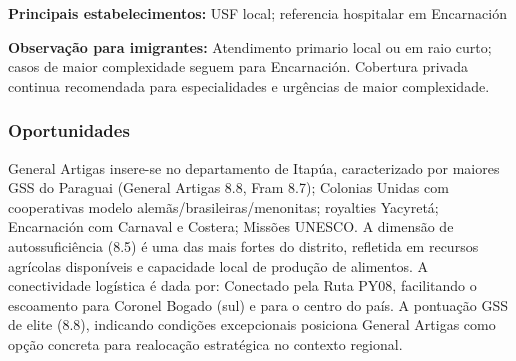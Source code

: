 \textbf{Principais estabelecimentos:} USF local; referencia hospitalar
em Encarnación

\textbf{Observação para imigrantes:} Atendimento primario local ou em
raio curto; casos de maior complexidade seguem para Encarnación.
Cobertura privada continua recomendada para especialidades e urgências
de maior complexidade.
\newpage

\subsubsection*{Oportunidades}\label{oport-general-artigas-0712}
General Artigas insere-se no departamento de Itapúa, caracterizado por maiores GSS do Paraguai (General Artigas 8.8, Fram 8.7); Colonias Unidas com cooperativas modelo alemãs/brasileiras/menonitas; royalties Yacyretá; Encarnación com Carnaval e Costera; Missões UNESCO. A dimensão de autossuficiência (8.5) é uma das mais fortes do distrito, refletida em recursos agrícolas disponíveis e capacidade local de produção de alimentos. A conectividade logística é dada por: Conectado pela Ruta PY08, facilitando o escoamento para Coronel Bogado (sul) e para o centro do país. A pontuação GSS de elite (8.8), indicando condições excepcionais posiciona General Artigas como opção concreta para realocação estratégica no contexto regional.

